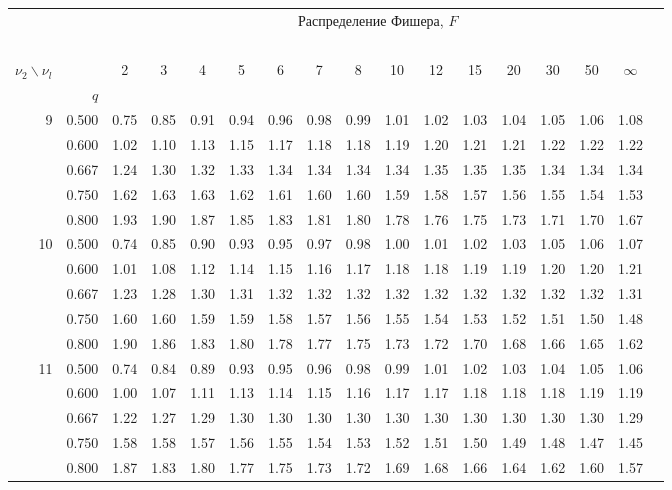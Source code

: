 \documentclass[pdftex,11pt,openany]{book}\usepackage[]{graphicx}\usepackage[]{color}
\begin{document}
{\newpage


\begin{center}
\begin{tabular}{rrr@{\,}r@{\,}r@{\,}r@{\,}r@{\,}r@{\,}r@{\,}r
                   @{\,}r@{\,}r@{\,}r@{\,}r@{\,}r@{\,}r@{\,}r}
&&\multicolumn{14}{c}{Распределение Фишера, $F$}\\
\ \\
$\nu_2\backslash\nu_l$ & & 
\multicolumn{1}{c}{2} &\multicolumn{1}{c}{3} &
\multicolumn{1}{c}{4} &\multicolumn{1}{c}{5} &
\multicolumn{1}{c}{6} &\multicolumn{1}{c}{7} &
\multicolumn{1}{c}{8} &\multicolumn{1}{c}{10}&
\multicolumn{1}{c}{12}&\multicolumn{1}{c}{15}&
\multicolumn{1}{c}{20}&\multicolumn{1}{c}{30}&
\multicolumn{1}{c}{50}&\multicolumn{1}{c}{$\infty$}\\
& $q$ \\
 9&0.500&0.75&0.85&0.91&0.94&0.96&0.98&0.99&1.01&1.02&1.03&1.04&1.05&1.06&1.08\\
  &0.600&1.02&1.10&1.13&1.15&1.17&1.18&1.18&1.19&1.20&1.21&1.21&1.22&1.22&1.22\\
  &0.667&1.24&1.30&1.32&1.33&1.34&1.34&1.34&1.34&1.35&1.35&1.35&1.34&1.34&1.34\\
  &0.750&1.62&1.63&1.63&1.62&1.61&1.60&1.60&1.59&1.58&1.57&1.56&1.55&1.54&1.53\\
  &0.800&1.93&1.90&1.87&1.85&1.83&1.81&1.80&1.78&1.76&1.75&1.73&1.71&1.70&1.67\\
10&0.500&0.74&0.85&0.90&0.93&0.95&0.97&0.98&1.00&1.01&1.02&1.03&1.05&1.06&1.07\\
  &0.600&1.01&1.08&1.12&1.14&1.15&1.16&1.17&1.18&1.18&1.19&1.19&1.20&1.20&1.21\\
  &0.667&1.23&1.28&1.30&1.31&1.32&1.32&1.32&1.32&1.32&1.32&1.32&1.32&1.32&1.31\\
  &0.750&1.60&1.60&1.59&1.59&1.58&1.57&1.56&1.55&1.54&1.53&1.52&1.51&1.50&1.48\\
  &0.800&1.90&1.86&1.83&1.80&1.78&1.77&1.75&1.73&1.72&1.70&1.68&1.66&1.65&1.62\\
11&0.500&0.74&0.84&0.89&0.93&0.95&0.96&0.98&0.99&1.01&1.02&1.03&1.04&1.05&1.06\\
  &0.600&1.00&1.07&1.11&1.13&1.14&1.15&1.16&1.17&1.17&1.18&1.18&1.18&1.19&1.19\\
  &0.667&1.22&1.27&1.29&1.30&1.30&1.30&1.30&1.30&1.30&1.30&1.30&1.30&1.30&1.29\\
  &0.750&1.58&1.58&1.57&1.56&1.55&1.54&1.53&1.52&1.51&1.50&1.49&1.48&1.47&1.45\\
  &0.800&1.87&1.83&1.80&1.77&1.75&1.73&1.72&1.69&1.68&1.66&1.64&1.62&1.60&1.57\\

\end{tabular}
\end{center}}
\end{document}
